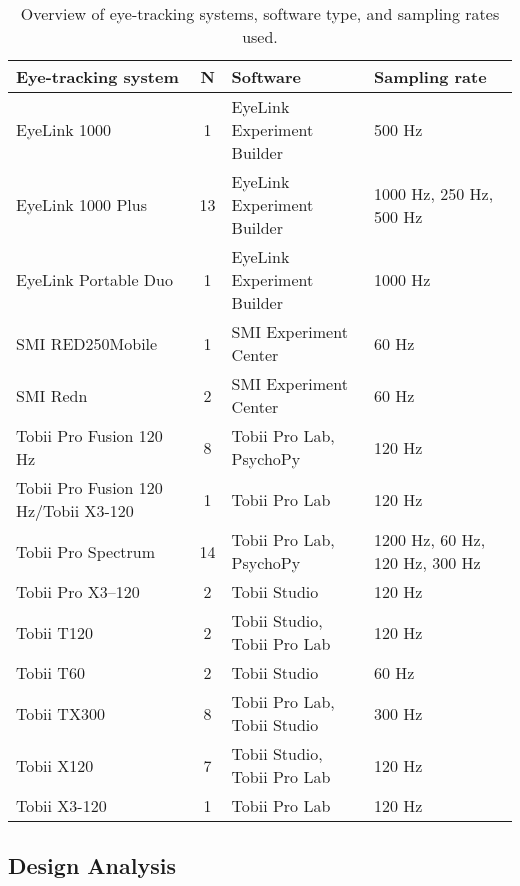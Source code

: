 \documentclass[
  man, donotrepeattitle,floatsintext]{apa6}
\begin{document}
\begin{table}[tbp]

\begin{center}
\begin{threeparttable}

\caption{\label{tab:Overwiew eye-tracking systems}Overview of eye-tracking systems, software type, and sampling rates used.}

\footnotesize{

\begin{tabular}{lcll}
\toprule
Eye-tracking system & N & Software & Sampling rate\\
\midrule
EyeLink 1000 & 1 & EyeLink Experiment Builder & 500 Hz\\
EyeLink 1000 Plus & 13 & EyeLink Experiment Builder & 1000 Hz, 250 Hz, 500 Hz\\
EyeLink Portable Duo & 1 & EyeLink Experiment Builder & 1000 Hz\\
SMI RED250Mobile & 1 & SMI Experiment Center & 60 Hz\\
SMI Redn & 2 & SMI Experiment Center & 60 Hz\\
Tobii Pro Fusion 120 Hz & 8 & Tobii Pro Lab, PsychoPy & 120 Hz\\
Tobii Pro Fusion 120 Hz/Tobii X3-120 & 1 & Tobii Pro Lab & 120 Hz\\
Tobii Pro Spectrum & 14 & Tobii Pro Lab, PsychoPy & 1200 Hz, 60 Hz, 120 Hz, 300 Hz\\
Tobii Pro X3–120 & 2 & Tobii Studio & 120 Hz\\
Tobii T120 & 2 & Tobii Studio, Tobii Pro Lab & 120 Hz\\
Tobii T60 & 2 & Tobii Studio & 60 Hz\\
Tobii TX300 & 8 & Tobii Pro Lab, Tobii Studio & 300 Hz\\
Tobii X120 & 7 & Tobii Studio, Tobii Pro Lab & 120 Hz\\
Tobii X3-120 & 1 & Tobii Pro Lab & 120 Hz\\
\bottomrule
\end{tabular}

}

\end{threeparttable}
\end{center}

\end{table}

\newpage

\subsection{Design Analysis}\label{design-analysis}
\end{document}
